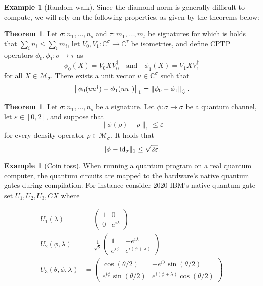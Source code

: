 \documentclass[10pt,a4paper]{amsart}
\theoremstyle{definition}
\theoremstyle{definition}
\newtheorem{example}[definition]{Example}
\theoremstyle{definition}
\theoremstyle{definition}
\theoremstyle{definition}
\theoremstyle{definition}
\newtheorem{theorem}[definition]{Theorem}
\begin{document}
\begin{example}[Random walk]
Since the diamond norm is generally difficult to compute, we will rely on the following properties, as given by the theorems below:

\begin{theorem} \cite[Theorem 3.55]{watrous2018theory} \label{theorem:diamond_iso}
  Let $\sigma: n_1, \ldots, n_s$ and  $\tau: m_1, \ldots, m_t$  be signatures for which is holds that $ \sum_i n_i \leq \sum_i m_i$, let $V_0,V_1: \mathbb{C}^{\sigma} \to \mathbb{C}^{\tau}$ be isometries, and define CPTP operators $\phi_0,\phi_1: \sigma \to \tau$ as
\[
\phi_0(X) = V_0XV_0^\dag \quad \text{and} \quad \phi_1(X) = V_1XV_1^\dag
\]
for all $X \in \mathcal{M}_\sigma$. There exists a unit vector $u \in \mathbb{C}^{\sigma} $ such that
\[
\left\lVert \phi_0(uu^\dag) - \phi_1(uu^\dag) \right\rVert_{1} = \left\lVert \phi_0 - \phi_1 \right\rVert_{\diamondsuit}.
\]
\end{theorem}

\begin{theorem} \cite[Theorem 3.56]{watrous2018theory} \label{theorem:diamond_cptp_id}
  Let $\sigma: n_1, \ldots, n_s$ be a signature. Let $\phi: \sigma \to \sigma $ be a quantum channel, let $\varepsilon \in [0,2]$, and suppose that
    \[
    \|\phi(\rho) - \rho\|_1 \leq \varepsilon
    \]
    for every density operator $\rho \in \mathcal{M}_\sigma$. It holds that
    \[
    \|\phi - \mathrm{id}_{\sigma}\|_1 \leq \sqrt{2\varepsilon}.
    \]
\end{theorem}

\begin{example}[Coin toss]
  When running a quantum program on a real quantum computer, the quantum circuits are mapped to the hardware's native quantum gates during compilation. For instance consider 2020 IBM's native quantum gate set $U_1,U_2,U_3,CX$ where

  \begin{align*}
    U_1(\lambda) &= 
    \begin{pmatrix}
        1 & 0 \\
        0 & e^{i\lambda}
    \end{pmatrix} \\
    U_2(\phi, \lambda) &= 
    \frac{1}{\sqrt{2}}
    \begin{pmatrix}
        1 & -e^{i\lambda} \\
        e^{i\phi} & e^{i(\phi+\lambda)}
    \end{pmatrix} \\
    U_3(\theta, \phi, \lambda) &= 
    \begin{pmatrix}
        \cos(\theta/2) & -e^{i\lambda}\sin(\theta/2) \\
        e^{i\phi}\sin(\theta/2) & e^{i(\phi+\lambda)}\cos(\theta/2)
    \end{pmatrix} \\
\end{align*}


\end{example}
\end{example}
\end{document}
